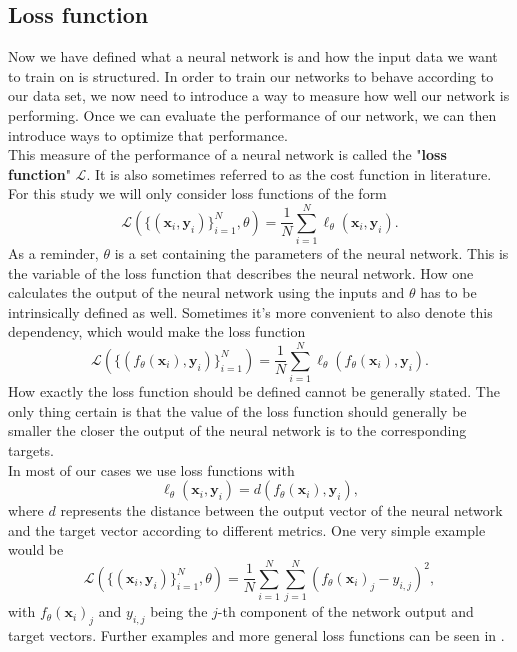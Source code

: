 \subsection{Loss function}
Now we have defined what a neural network is and how the input data we want to train on is structured. In order to train our networks to behave according to our data set, we now need to introduce a way to measure how well our network is performing. Once we can evaluate the performance of our network, we can then introduce ways to optimize that performance.\\
This measure of the performance of a neural network is called the "\textbf{loss function}" $\mathscr{L}$. It is also sometimes referred to as the cost function in literature. For this study we will only consider loss functions of the form 
\begin{equation}
	\mathscr{L}\left( \{(\mathbf{x}_i, \mathbf{y}_i)\}_{i=1}^{N}, \theta \right) = \frac{1}{N} \sum_{i=1}^{N} \ell_\theta\left(\mathbf{x}_i,\mathbf{y}_i\right).
	\label{eq:Loss_longform}
\end{equation}
As a reminder, $\theta$ is a set containing the parameters of the neural network. This is the variable of the loss function that describes the neural network. How one calculates the output of the neural network using the inputs and $\theta$ has to be intrinsically defined as well. Sometimes it's more convenient to also denote this dependency, which would make the loss function
\begin{equation}\label{eq:Loss_longform_withFunctiondependency}
	\mathscr{L}\left( \{(f_\theta(\mathbf{x}_i), \mathbf{y}_i)\}_{i=1}^{N} \right) = \frac{1}{N} \sum_{i=1}^{N} \ell_\theta\left(f_\theta(\mathbf{x}_i),\mathbf{y}_i\right).
\end{equation}
How exactly the loss function should be defined cannot be generally stated. The only thing certain is that the value of the loss function should generally be smaller the closer the output of the neural network is to the corresponding targets.\\
In most of our cases we use loss functions with 
\begin{equation}
	\ell_\theta \left( \mathbf{x}_i,\mathbf{y}_i\right) = 
	d\left(f_\theta(\mathbf{x}_i), \mathbf{y}_i\right),
\end{equation}
where $d$ represents the distance between the output vector of the neural network and the target vector according to different metrics. One very simple example would be 
\begin{equation}
	\mathscr{L}\left( \{(\mathbf{x}_i, \mathbf{y}_i)\}_{i=1}^{N}, \theta \right) = \frac{1}{N} \sum_{i=1}^{N} \sum_{j=1}^{N} \left(f_\theta(\mathbf{x}_i)_j - y_{i,j}\right)^2,
\end{equation}
with $f_\theta(\mathbf{x}_i)_j$ and $y_{i,j}$ being the $j$-th component of the network output and target vectors. Further examples and more general loss functions can be seen in \cite{LossExamplePaper}.

